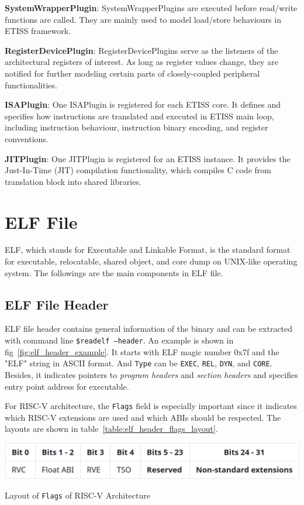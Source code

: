 \textbf{SystemWrapperPlugin}: SystemWrapperPlugins are executed before read/write functions are called. They are mainly used to model load/store behaviours in ETISS framework.

\textbf{RegisterDevicePlugin}: RegisterDevicePlugins serve as the listeners of the architectural registers of interest. As long as register values change, they are notified for further modeling certain parts of closely-coupled peripheral functionalities.

\textbf{ISAPlugin}: One ISAPlugin is registered for each ETISS core. It defines and specifies how instructions are translated and executed in ETISS main loop, including instruction behaviour, instruction binary encoding, and register conventions.

\textbf{JITPlugin}: One JITPlugin is registered for an ETISS instance. It provides the Just-In-Time (JIT) compilation functionality, which compiles C code from translation block into shared libraries.

\section{ELF File}
ELF, which stands for Executable and Linkable Format, is the standard format for executable, relocatable, shared object, and core dump on UNIX-like operating system. The followings are the main components in ELF file.

\subsection{ELF File Header}
\label{subsec:ELF}

ELF file header contains general information of the binary and can be extracted with command line \texttt{\$readelf --header}. An example is shown in fig~\ref{fig:elf_header_example}. It starts with ELF magic number 0x7f and the "ELF" string in ASCII format. And \texttt{Type} can be \texttt{EXEC}, \texttt{REL}, \texttt{DYN}, and \texttt{CORE}. Besides, it indicates pointers to \textit{program headers} and \textit{section headers} and specifies entry point address for executable.

For RISC-V architecture, the \texttt{Flags} field is especially important since it indicates which RISC-V extensions are used and which ABIs should be respected. The layouts are shown in table~\ref{table:elf_header_flags_layout}. 

\begin{table}
    \centering
    \includegraphics[width=.85\linewidth]{figures/ELF_header_flags_layout.png}
    \caption{Layout of \texttt{Flags} of RISC-V Architecture}
    \label{table:elf_header_flags_layout}
\end{table}

